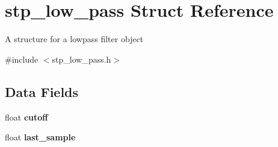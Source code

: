 \hypertarget{structstp__low__pass}{}\section{stp\+\_\+low\+\_\+pass Struct Reference}
\label{structstp__low__pass}


A structure for a lowpass filter object ~\newline
  




{\ttfamily \#include $<$stp\+\_\+low\+\_\+pass.\+h$>$}

\subsection*{Data Fields}
\begin{DoxyCompactItemize}
\item 
\mbox{\label{structstp__low__pass_a49d2acef157bfcfac3e09931076cd739}} 
float {\bfseries cutoff}
\item 
\mbox{\label{structstp__low__pass_aff19710c26a6a5ac1d3b157c56bb24e8}} 
float {\bfseries last\+\_\+sample}
\end{DoxyCompactItemize}
